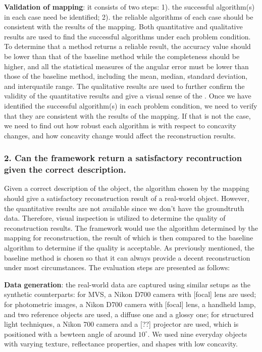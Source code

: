 \noindent\textbf{Validation of mapping}: it consists of two steps: 1). the successful algorithm(s) in each case need be identified; 2). the reliable algorithms of each case should be consistent with the results of the mapping. Both quantitative and qualitative results are used to find the successful algorithms under each problem condition. To determine that a method returns a reliable result, the accuracy value should be lower than that of the baseline method while the completeness should be higher, and all the statistical measures of the angular error must be lower than those of the baseline method, including the mean, median, standard deviation, and interquatile range. The qualitative results are used to further confirm the validity of the quantitative results and give a visual sense of the . Once we have identified the successful algorithm(s) in each problem condition, we need to verify that they are consistent with the results of the mapping. If that is not the case, we need to find out how robust each algorithm is with respect to concavity changes, and how concavity change would affect the reconstruction results.

\subsubsection{2. Can the framework return a satisfactory recontruction given the correct description.}
Given a correct description of the object, the algorithm chosen by the mapping should give a satisfactory reconstruction result of a real-world object. However, the quantitative results are not available since we don't have the groundtruth data. Therefore, visual inspection is utilized to determine the quality of reconstruction results. The framework would use the algorithm determined by the mapping for reconstruction, the result of which is then compared to the baseline algorithm to determine if the quality is acceptable. As previously mentioned, the baseline method is chosen so that it can always provide a decent reconstruction under most circumstances. The evaluation steps are presented as follows:

\noindent\textbf{Data generation}: the real-world data are captured using similar setups as the synthetic counterparts: for MVS, a Nikon D700 camera with [focal] lens are used; for photometric images, a Nikon D700 camera with [focal] lens, a handheld lamp, and two reference objects are used, a diffuse one and a glossy one; for structured light techniques, a Nikon 700 camera and a [??] projector are used, which is positioned with a bewteen angle of around $10^\circ$. We used nine everyday objects with varying texture, reflectance properties, and shapes with low concavity.

